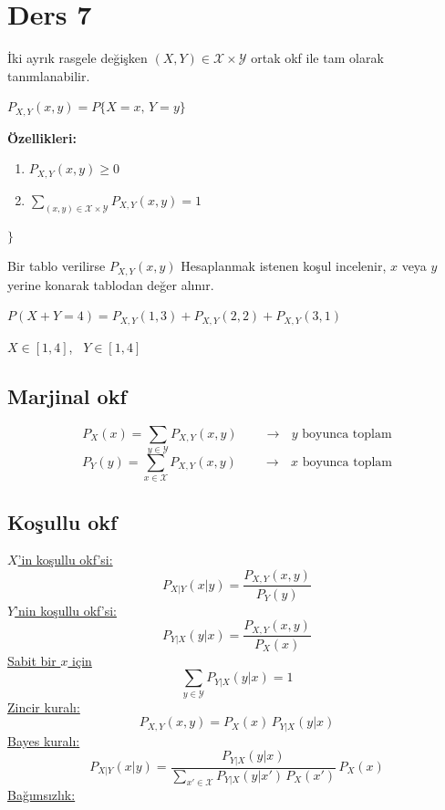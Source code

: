 \documentclass[11pt,a4paper]{article}
\begin{document}

\section{Ders 7}
İki ayrık rasgele değişken $(X,Y)\in\mathcal{X}\times\mathcal{Y}$ ortak okf ile tam olarak tanımlanabilir.

\noindent
\begin{minipage}[c]{0.44\linewidth}
$P_{X,Y}(x,y)=P\{X=x,\,Y=y\}$

\textbf{Özellikleri:}
\begin{enumerate}[nosep,leftmargin=*]
  \item $P_{X,Y}(x,y)\geq 0$
  \item $\displaystyle\sum_{(x,y)\in\mathcal{X}\times\mathcal{Y}}P_{X,Y}(x,y)=1$
\end{enumerate}
\end{minipage}$\Bigg\}$\hfill
\begin{minipage}[c]{0.46\linewidth}
Bir tablo verilirse $P_{X,Y}(x,y)$ Hesaplanmak istenen koşul incelenir, $x$ veya $y$ yerine konarak tablodan değer alınır.
\end{minipage}

\begin{ornek}
  $P(X+Y=4)=P_{X,Y}(1,3)+P_{X,Y}(2,2)+P_{X,Y}(3,1)$

  $X\in[1,4]$, \ $Y\in[1,4]$
\end{ornek}

\subsection{Marjinal okf}
\[ P_X(x)=\sum_{y\in\mathcal{Y}}P_{X,Y}(x,y) \qquad \text{$\to$ $y$ boyunca toplam} \]
\[ P_Y(y)=\sum_{x\in\mathcal{X}}P_{X,Y}(x,y) \qquad \text{$\to$ $x$ boyunca toplam} \]

\subsection{Koşullu okf}
\underline{$X$'in koşullu okf'si:}
\[ P_{X|Y}(x|y)=\frac{P_{X,Y}(x,y)}{P_Y(y)} \]
\underline{$Y$'nin koşullu okf'si:}
\[ P_{Y|X}(y|x)=\frac{P_{X,Y}(x,y)}{P_X(x)} \]
\underline{Sabit bir $x$ için}
\[ \sum_{y\in\mathcal{Y}}P_{Y|X}(y|x)=1 \]
\underline{Zincir kuralı:}
\[ P_{X,Y}(x,y)=P_X(x)\,P_{Y|X}(y|x) \]
\underline{Bayes kuralı:}
\[ P_{X|Y}(x|y)=\frac{P_{Y|X}(y|x)}{\sum_{x'\in\mathcal{X}}P_{Y|X}(y|x')\,P_X(x')}\,P_X(x) \]
\underline{Bağımsızlık:}
\end{document}
